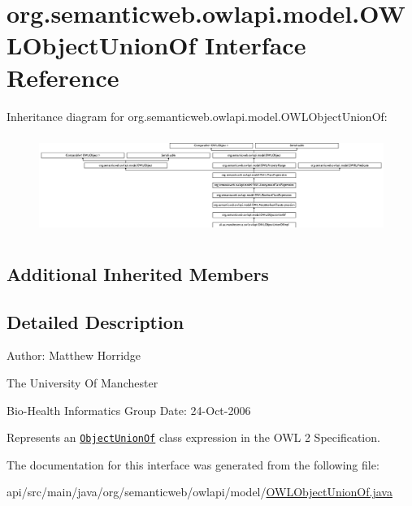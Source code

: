 \hypertarget{interfaceorg_1_1semanticweb_1_1owlapi_1_1model_1_1_o_w_l_object_union_of}{\section{org.\-semanticweb.\-owlapi.\-model.\-O\-W\-L\-Object\-Union\-Of Interface Reference}
\label{interfaceorg_1_1semanticweb_1_1owlapi_1_1model_1_1_o_w_l_object_union_of}
}
Inheritance diagram for org.\-semanticweb.\-owlapi.\-model.\-O\-W\-L\-Object\-Union\-Of\-:\begin{figure}[H]
\begin{center}
\leavevmode
\includegraphics[height=3.222507cm]{interfaceorg_1_1semanticweb_1_1owlapi_1_1model_1_1_o_w_l_object_union_of}
\end{center}
\end{figure}
\subsection*{Additional Inherited Members}


\subsection{Detailed Description}
Author\-: Matthew Horridge\par
 The University Of Manchester\par
 Bio-\/\-Health Informatics Group Date\-: 24-\/\-Oct-\/2006 

Represents an \href{http://www.w3.org/TR/2009/REC-owl2-syntax-20091027/#Union_of_Class_Expressions}{\tt Object\-Union\-Of} class expression in the O\-W\-L 2 Specification. 

The documentation for this interface was generated from the following file\-:\begin{DoxyCompactItemize}
\item 
api/src/main/java/org/semanticweb/owlapi/model/\hyperlink{_o_w_l_object_union_of_8java}{O\-W\-L\-Object\-Union\-Of.\-java}\end{DoxyCompactItemize}
